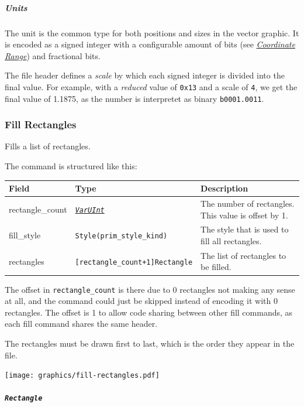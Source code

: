 \documentclass[]{article}
\newcommand{\link}[2]{\hyperlink{#1}{\emph{#2}}}
\begin{document}
\hypertarget{units}{\subparagraph{Units}\label{units}}

The unit is the common type for both positions and sizes in the vector
graphic. It is encoded as a signed integer with a configurable amount of
bits (see \link{coordinate-range}{Coordinate Range}) and
fractional bits.

The file header defines a \emph{scale} by which each signed integer is
divided into the final value. For example, with a \emph{reduced} value
of \texttt{0x13} and a scale of \texttt{4}, we get the final value of
1.1875, as the number is interpretet as binary \texttt{b0001.0011}.

\hypertarget{fill-rectangles}{\subsubsection{Fill Rectangles}\label{fill-rectangles}}

Fills a list of rectangles.

The command is structured like this:

\begin{longtable}[]{@{}p{1in}p{2in}p{3in}@{}}
\toprule
Field & Type & Description \\
\midrule
\endhead
rectangle\_count & \link{varuint}{\texttt{VarUInt}}           & The number of rectangles. This value is offset by 1. \\
fill\_style      & \texttt{Style(prim\_style\_kind)}          & The style that is used to fill all rectangles. \\
rectangles       & \texttt{{[}rectangle\_count+1{]}Rectangle} & The list of rectangles to be filled. \\
\bottomrule
\end{longtable}

The offset in \texttt{rectangle\_count} is there due to 0 rectangles not
making any sense at all, and the command could just be skipped instead of
encoding it with 0 rectangles. The offset is 1 to allow code sharing
between other fill commands, as each fill command shares the same
header.

The rectangles must be drawn first to last, which is the order they appear
in the file.

\begin{center}
  \texttt{[image: graphics/fill-rectangles.pdf]}
\end{center}

\hypertarget{rectangle}{\subparagraph{\texorpdfstring{\texttt{Rectangle}}{Rectangle}}\label{rectangle}}
\end{document}
